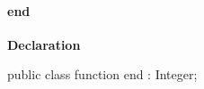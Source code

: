 \documentclass{report}
\newif\ifpdf
\begin{document}
\paragraph*{end}\hspace*{\fill}

\label{ok_prefix_identifier.TTest-end}
\begin{list}{}{
\setlength{\itemindent}{0cm}
\setlength{\listparindent}{0cm}
\setlength{\leftmargin}{\evensidemargin}
\addtolength{\leftmargin}{\tmplength}
\settowidth{\labelsep}{X}
\addtolength{\leftmargin}{\labelsep}
\setlength{\labelwidth}{\tmplength}
}
\item[\textbf{Declaration}\hfill]
\ifpdf
\begin{flushleft}
\fi
\begin{ttfamily}
public class function end : Integer;\end{ttfamily}

\ifpdf
\end{flushleft}
\fi

\end{list}
\end{document}
